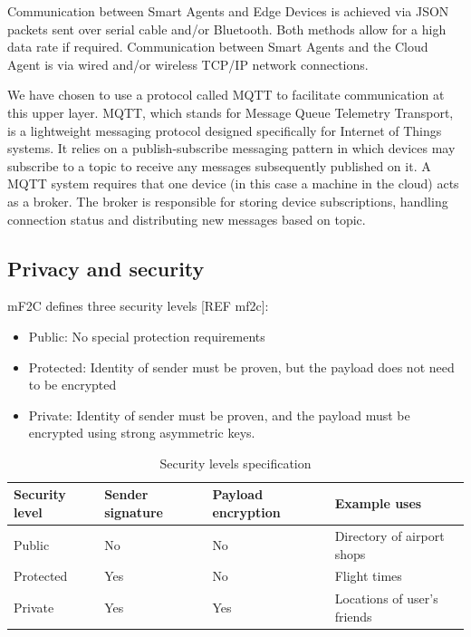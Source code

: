 \documentclass{article}
\begin{document}
Communication between Smart Agents and Edge Devices is achieved via JSON packets sent over serial cable and/or Bluetooth. Both methods allow for a high data rate if required. Communication between Smart Agents and the Cloud Agent is via wired and/or wireless TCP/IP network connections.
 
We have chosen to use a protocol called MQTT to facilitate communication at this upper layer. MQTT, which stands for Message Queue Telemetry Transport, is a lightweight messaging protocol designed specifically for Internet of Things systems. It relies on a publish-subscribe messaging pattern in which devices may subscribe to a topic to receive any messages subsequently published on it. A MQTT system requires that one device (in this case a machine in the cloud) acts as a broker. The broker is responsible for storing device subscriptions, handling connection status and distributing new messages based on topic.

\subsection{Privacy and security}

mF2C defines three security levels [REF mf2c]:

\begin{itemize}
    \item Public: No special protection requirements
    \item Protected: Identity of sender must be proven, but the payload does not need to be encrypted
    \item Private: Identity of sender must be proven, and the payload must be encrypted using strong asymmetric keys.
\end{itemize}

\begin{table}[h!]
    \begin{center}
        \begin{tabular}{ |p{2cm}|p{3cm}|p{3cm}|p{4cm}| } 
            \hline
            Security level & Sender signature & Payload encryption & Example uses \\ \hline
            Public & No & No & Directory of airport shops \\ \hline
            Protected & Yes & No & Flight times \\ \hline
            Private & Yes & Yes & Locations of user's friends \\
            \hline
        \end{tabular}
        \caption{Security levels specification}
        \label{table:secure_levels}
    \end{center}
\end{table}    
\end{document}
